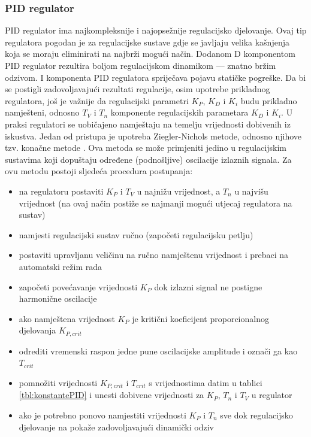 \documentclass[times, utf8, diplomski]{fer}
\begin{document}
\subsubsection{PID regulator}\label{PIDreg}
PID regulator ima najkompleksnije i najopsežnije regulacijsko djelovanje. Ovaj tip regulatora pogodan je za regulacijske sustave gdje se javljaju velika kašnjenja koja se moraju eliminirati na najbrži mogući način. Dodanom D komponentom PID regulator rezultira boljom regulacijskom dinamikom --- znatno bržim odzivom. I komponenta PID regulatora spriječava pojavu statičke pogreške. 
Da bi se postigli zadovoljavajući rezultati regulacije, osim upotrebe  prikladnog regulatora, još je važnije da regulacijski parametri $K_P$, $K_D$ i $K_i$ budu prikladno namješteni, odnosno $T_V$ i $T_n$ komponente regulacijskih parametara $K_D$ i $K_i$.
U praksi regulatori se uobičajeno namještaju na temelju vrijednosti dobivenih iz iskustva.
Jedan od pristupa je upotreba Ziegler-Nichols metode, odnosno njihove tzv. konačne metode .
Ova metoda se može primjeniti jedino u regulacijskim sustavima koji dopuštaju određene (podnošljive) oscilacije izlaznih signala.
Za ovu metodu postoji sljedeća procedura postupanja:
\begin{itemize}
\item na regulatoru postaviti $K_P$ i $T_V$ u najnižu vrijednost, a $T_n$ u najvišu vrijednost (na ovaj način postiže se najmanji mogući utjecaj regulatora na sustav)
\item namjesti regulacijski sustav ručno (započeti regulacijsku petlju)
\item postaviti upravljanu veličinu na ručno namještenu vrijednost i prebaci na automatski režim rada
\item započeti povećavanje vrijednosti $K_P$ dok izlazni signal ne postigne harmonične 
oscilacije
\item ako namještena vrijednost $K_P$ je kritični koeficijent proporcionalnog djelovanja $K_{P,crit}$
\item odrediti vremenski raspon jedne pune oscilacijske amplitude i označi ga kao $T_{crit}$
\item pomnožiti vrijednosti $K_{P,crit}$ i $T_{crit}$ s vrijednostima datim u tablici \ref{tbl:konstantePID} i unesti dobivene vrijednosti za $K_P$, $T_n$ i $T_V$ u regulator
\item ako je potrebno ponovo namjestiti vrijednosti $K_P$ i $T_n$ sve dok regulacijsko djelovanje na pokaže zadovoljavajući dinamički odziv
\end{itemize}
\end{document}
